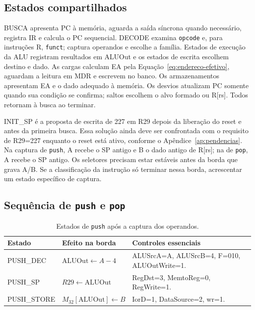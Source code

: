 
\subsection{Estados compartilhados}\label{subsec:estados-comuns}

BUSCA apresenta PC à memória, aguarda a saída síncrona quando necessário, registra IR e calcula o PC sequencial. DECODE examina \texttt{opcode} e, para instruções R, \texttt{funct}; captura operandos e escolhe a família. Estados de execução da ALU registram resultados em ALUOut e os estados de escrita escolhem destino e dado. As cargas calculam EA pela Equação~\ref{eq:endereco-efetivo}, aguardam a leitura em MDR e escrevem no banco. Os armazenamentos apresentam EA e o dado adequado à memória. Os desvios atualizam PC somente quando sua condição se confirma; saltos escolhem o alvo formado ou R[rs]. Todos retornam à busca ao terminar.

INIT\_SP é a proposta de escrita de 227 em R29 depois da liberação do reset e antes da primeira busca. Essa solução ainda deve ser confrontada com o requisito de R29=227 enquanto o reset está ativo, conforme o Apêndice~\ref{ap:pendencias}. Na captura de \texttt{push}, A recebe o SP antigo e B o dado antigo de R[rs]; na de \texttt{pop}, A recebe o SP antigo. Os seletores precisam estar estáveis antes da borda que grava A/B. Se a classificação da instrução só terminar nessa borda, acrescentar um estado específico de captura.

\subsection{Sequência de \texttt{push} e \texttt{pop}}\label{sec:estados-pilha}

\begin{table}[H]\centering\footnotesize
\caption{Estados de \texttt{push} após a captura dos operandos.}\label{tab:push-estados}
\begin{tabularx}{\linewidth}{@{}p{2.5cm}p{4cm}X@{}}\toprule
Estado & Efeito na borda & Controles essenciais \\\midrule
PUSH\_DEC & $\mathrm{ALUOut}\gets A-4$ & ALUSrcA=A, ALUSrcB=4, F=010, ALUOutWrite=1. \\
PUSH\_SP & $R29\gets\mathrm{ALUOut}$ & RegDst=3, MemtoReg=0, RegWrite=1. \\
PUSH\_STORE & $M_{32}[\mathrm{ALUOut}]\gets B$ & IorD=1, DataSource=2, wr=1. \\\bottomrule
\end{tabularx}
\end{table}

